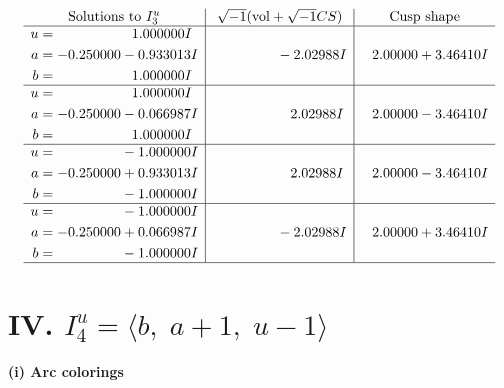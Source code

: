 \documentclass[1p]{elsarticle_modified}
\theoremstyle{definition}
\newcommand{\I}{\sqrt{-1}}
\begin{document}
$$\begin{array}{c|c|c}  
\text{Solutions to }I^u_{3}& \I (\text{vol} + \sqrt{-1}CS) & \text{Cusp shape}\\
 \hline 
\begin{aligned}
u &= \phantom{-0.000000 -}1.000000 I \\
a &= -0.250000 - 0.933013 I \\
b &= \phantom{-0.000000 -}1.000000 I\end{aligned}
 & \phantom{-0.000000 } -2.02988 I & \phantom{-}2.00000 + 3.46410 I \\ \hline\begin{aligned}
u &= \phantom{-0.000000 -}1.000000 I \\
a &= -0.250000 - 0.066987 I \\
b &= \phantom{-0.000000 -}1.000000 I\end{aligned}
 & \phantom{-0.000000 -}2.02988 I & \phantom{-}2.00000 - 3.46410 I \\ \hline\begin{aligned}
u &= \phantom{-0.000000 } -1.000000 I \\
a &= -0.250000 + 0.933013 I \\
b &= \phantom{-0.000000 } -1.000000 I\end{aligned}
 & \phantom{-0.000000 -}2.02988 I & \phantom{-}2.00000 - 3.46410 I \\ \hline\begin{aligned}
u &= \phantom{-0.000000 } -1.000000 I \\
a &= -0.250000 + 0.066987 I \\
b &= \phantom{-0.000000 } -1.000000 I\end{aligned}
 & \phantom{-0.000000 } -2.02988 I & \phantom{-}2.00000 + 3.46410 I\\
 \hline 
 \end{array}$$\newpage\newpage\renewcommand{\arraystretch}{1}
\centering \section*{IV. $I^u_{4}= \langle b,\;a+1,\;u-1 \rangle$}
\flushleft \textbf{(i) Arc colorings}\\
\end{document}
